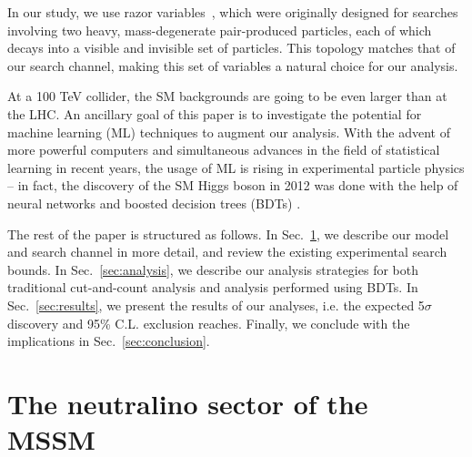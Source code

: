 \documentclass[a4paper,11pt]{article}
\begin{document}
In our study, we use razor variables~\cite{Rogan:2010kb}, which were originally designed
for searches involving two heavy, mass-degenerate pair-produced
particles, each of which decays into a visible and invisible set of
particles. This topology matches that of our search channel, making this
set of variables a natural choice for our analysis.  

At a 100 TeV collider, the  SM backgrounds are going to be even larger than
at the LHC.  An ancillary goal of this paper is to investigate the
potential for machine learning (ML) techniques to augment our analysis.
With the advent of more powerful computers and simultaneous advances in
the field of statistical learning in recent years, the usage of ML is
rising in experimental particle physics -- in fact, the discovery of the
SM Higgs boson in 2012 was done with the help of neural networks
\cite{Aad:2012tfa} and boosted decision trees (BDTs)
\cite{Chatrchyan:2012xdj}.

The rest of the paper is structured as follows. In Sec.~\ref{sec:model}, we
describe our model and search channel in more detail, and review the existing
experimental search bounds. In Sec.~\ref{sec:analysis}, we describe our
analysis strategies for both traditional cut-and-count analysis and analysis
performed using BDTs. In Sec.~\ref{sec:results}, we present the results of our
analyses, i.e. the expected 5$\sigma$ discovery and 95\% C.L. exclusion
reaches. Finally, we conclude with the implications in
Sec.~\ref{sec:conclusion}.

\section{The neutralino sector of the MSSM}
\label{sec:model}
\end{document}

